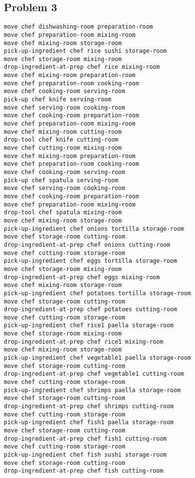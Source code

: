 \documentclass[a4paper,12pt]{article}
\begin{document}
\subsection{Problem 3}
\label{sec:plan3}
\begin{lstlisting}[language=PDDL, caption=Plan for Problem 3]
move chef dishwashing-room preparation-room 
move chef preparation-room mixing-room 
move chef mixing-room storage-room 
pick-up-ingredient chef rice sushi storage-room 
move chef storage-room mixing-room 
drop-ingredient-at-prep chef rice mixing-room 
move chef mixing-room preparation-room 
move chef preparation-room cooking-room 
move chef cooking-room serving-room 
pick-up chef knife serving-room 
move chef serving-room cooking-room 
move chef cooking-room preparation-room 
move chef preparation-room mixing-room 
move chef mixing-room cutting-room 
drop-tool chef knife cutting-room 
move chef cutting-room mixing-room 
move chef mixing-room preparation-room 
move chef preparation-room cooking-room 
move chef cooking-room serving-room 
pick-up chef spatula serving-room 
move chef serving-room cooking-room 
move chef cooking-room preparation-room 
move chef preparation-room mixing-room 
drop-tool chef spatula mixing-room 
move chef mixing-room storage-room 
pick-up-ingredient chef onions tortilla storage-room 
move chef storage-room cutting-room 
drop-ingredient-at-prep chef onions cutting-room 
move chef cutting-room storage-room 
pick-up-ingredient chef eggs tortilla storage-room 
move chef storage-room mixing-room 
drop-ingredient-at-prep chef eggs mixing-room 
move chef mixing-room storage-room 
pick-up-ingredient chef potatoes tortilla storage-room 
move chef storage-room cutting-room 
drop-ingredient-at-prep chef potatoes cutting-room 
move chef cutting-room storage-room 
pick-up-ingredient chef rice1 paella storage-room 
move chef storage-room mixing-room 
drop-ingredient-at-prep chef rice1 mixing-room 
move chef mixing-room storage-room 
pick-up-ingredient chef vegetable1 paella storage-room 
move chef storage-room cutting-room 
drop-ingredient-at-prep chef vegetable1 cutting-room 
move chef cutting-room storage-room 
pick-up-ingredient chef shrimps paella storage-room 
move chef storage-room cutting-room 
drop-ingredient-at-prep chef shrimps cutting-room 
move chef cutting-room storage-room 
pick-up-ingredient chef fish1 paella storage-room 
move chef storage-room cutting-room 
drop-ingredient-at-prep chef fish1 cutting-room 
move chef cutting-room storage-room 
pick-up-ingredient chef fish sushi storage-room 
move chef storage-room cutting-room 
drop-ingredient-at-prep chef fish cutting-room 

\end{lstlisting}
\end{document}
